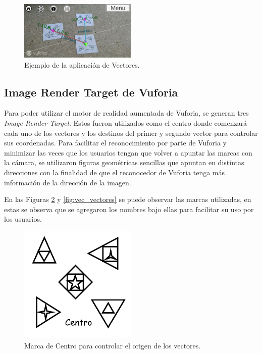 \begin{figure}[hbt!]
\centering
\includegraphics[width=0.5\textwidth]{figuras/vectores/Vectores1.png}
\caption{\label{fig:vec_ej1}Ejemplo de la aplicación de Vectores.}
\end{figure}
\FloatBarrier

\subsection{Image Render Target de Vuforia}
Para poder utilizar el motor de realidad aumentada de Vuforia, se generan tres \textit{Image Render Target}. Estos fueron utilizados como el centro donde comenzará cada uno de los vectores y los destinos del primer y segundo vector para controlar sus coordenadas. Para facilitar el reconocimiento por parte de Vuforia y minimizar las veces que los usuarios tengan que volver a apuntar las marcas con la cámara, se utilizaron figuras geométricas sencillas que apuntan en distintas direcciones con la finalidad de que el reconocedor de Vuforia tenga más información de la dirección de la imagen. 

En las Figuras \ref{fig:vec_centro} y \ref{fig:vec_vectores} se puede observar las marcas utilizadas, en estas se observa que se agregaron los nombres bajo ellas para facilitar su uso por los usuarios.

\begin{figure}[hbt!]
\centering
\includegraphics[width=0.5\textwidth]{figuras/vectores/ImageTarget1.png}
\caption{\label{fig:vec_centro}Marca de Centro para controlar el origen de los vectores.}
\end{figure}

